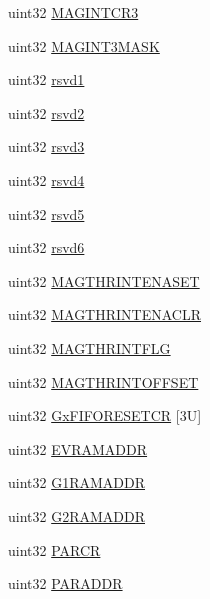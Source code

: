 \begin{DoxyCompactItemize}
\item 
uint32 \mbox{\hyperlink{structadcBase_a9d97c61c0d5181ef78f46d075c949efc}{M\+A\+G\+I\+N\+T\+C\+R3}}
\item 
uint32 \mbox{\hyperlink{structadcBase_a71d2d3aa86228a2e8055dd1bc813d4a1}{M\+A\+G\+I\+N\+T3\+M\+A\+SK}}
\item 
uint32 \mbox{\hyperlink{structadcBase_a8f69539e251a55549f040160b12484a8}{rsvd1}}
\item 
uint32 \mbox{\hyperlink{structadcBase_a4b8ab6764f7589cd79605f5f52baa09b}{rsvd2}}
\item 
uint32 \mbox{\hyperlink{structadcBase_a7a97f3493456646e082804fe861ca249}{rsvd3}}
\item 
uint32 \mbox{\hyperlink{structadcBase_aebf85ec0db73048b4437abdd2818228b}{rsvd4}}
\item 
uint32 \mbox{\hyperlink{structadcBase_abe75adeafe981064dc22b03772d7dfca}{rsvd5}}
\item 
uint32 \mbox{\hyperlink{structadcBase_a93ad1980e793c3b2f39c37ce8825ab24}{rsvd6}}
\item 
uint32 \mbox{\hyperlink{structadcBase_a04ec00cdc73029ec4fa5d06a4a2e1506}{M\+A\+G\+T\+H\+R\+I\+N\+T\+E\+N\+A\+S\+ET}}
\item 
uint32 \mbox{\hyperlink{structadcBase_a7487a0f3d025dc9a6a613a188c872acf}{M\+A\+G\+T\+H\+R\+I\+N\+T\+E\+N\+A\+C\+LR}}
\item 
uint32 \mbox{\hyperlink{structadcBase_ad0f80bc0820675e69239c9c7da2ca327}{M\+A\+G\+T\+H\+R\+I\+N\+T\+F\+LG}}
\item 
uint32 \mbox{\hyperlink{structadcBase_a4a186dceffea69d5f941f3fffb69af40}{M\+A\+G\+T\+H\+R\+I\+N\+T\+O\+F\+F\+S\+ET}}
\item 
uint32 \mbox{\hyperlink{structadcBase_a6ec3d8d0ec7784ac111571c407ba0527}{Gx\+F\+I\+F\+O\+R\+E\+S\+E\+T\+CR}} \mbox{[}3\+U\mbox{]}
\item 
uint32 \mbox{\hyperlink{structadcBase_a2be1a3c9a334921a209f645cf67ef1a5}{E\+V\+R\+A\+M\+A\+D\+DR}}
\item 
uint32 \mbox{\hyperlink{structadcBase_a5d65fa13814212751754341e12504367}{G1\+R\+A\+M\+A\+D\+DR}}
\item 
uint32 \mbox{\hyperlink{structadcBase_a9f7fa996163d406e916f1bb28ba927cd}{G2\+R\+A\+M\+A\+D\+DR}}
\item 
uint32 \mbox{\hyperlink{structadcBase_a258b46156bf02ed3683eb85da01542e4}{P\+A\+R\+CR}}
\item 
uint32 \mbox{\hyperlink{structadcBase_ad03e7164c5587a9427ce55c8cb88f74e}{P\+A\+R\+A\+D\+DR}}
\item 

\end{DoxyCompactItemize}
